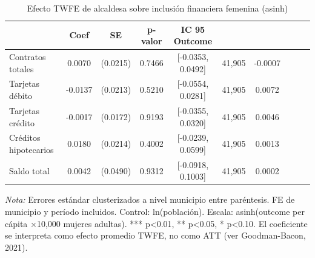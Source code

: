 \begin{table}[htbp]
\centering
\small
\caption{Efecto TWFE de alcaldesa sobre inclusión financiera femenina (asinh)}
\label{tab:twfe}
\begin{tabular}{lcccccc}
\toprule
 & Coef & SE & p-valor & IC 95%
Outcome &  &  &  &  &  &  \\
\midrule
Contratos totales & 0.0070 & (0.0215) & 0.7466 & [-0.0353, 0.0492] & 41,905 & -0.0007 \\
Tarjetas débito & -0.0137 & (0.0213) & 0.5210 & [-0.0554, 0.0281] & 41,905 & 0.0072 \\
Tarjetas crédito & -0.0017 & (0.0172) & 0.9193 & [-0.0355, 0.0320] & 41,905 & 0.0046 \\
Créditos hipotecarios & 0.0180 & (0.0214) & 0.4002 & [-0.0239, 0.0599] & 41,905 & 0.0013 \\
Saldo total & 0.0042 & (0.0490) & 0.9312 & [-0.0918, 0.1003] & 41,905 & 0.0002 \\
\bottomrule
\end{tabular}
\vspace{2mm}
\parbox{\textwidth}{\footnotesize \textit{Nota:} Errores estándar clusterizados a nivel municipio entre paréntesis. FE de municipio y período incluidos. Control: ln(población). Escala: asinh(outcome per cápita ×10,000 mujeres adultas). *** p<0.01, ** p<0.05, * p<0.10. El coeficiente se interpreta como efecto promedio TWFE, no como ATT (ver Goodman-Bacon, 2021).}
\end{table}